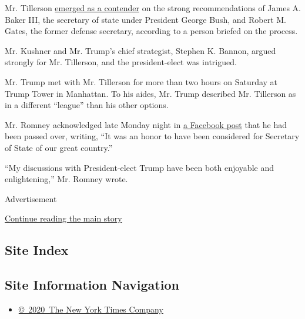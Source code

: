 Mr. Tillerson
\href{https://www.nytimes3xbfgragh.onion/2016/12/09/us/politics/rex-tillerson-secretary-of-state-exxon-donald-trump.html}{emerged
as a contender} on the strong recommendations of James A. Baker III, the
secretary of state under President George Bush, and Robert M. Gates, the
former defense secretary, according to a person briefed on the process.

Mr. Kushner and Mr. Trump's chief strategist, Stephen K. Bannon, argued
strongly for Mr. Tillerson, and the president-elect was intrigued.

Mr. Trump met with Mr. Tillerson for more than two hours on Saturday at
Trump Tower in Manhattan. To his aides, Mr. Trump described Mr.
Tillerson as in a different ``league'' than his other options.

Mr. Romney acknowledged late Monday night in
\href{https://www.facebookcorewwwi.onion/mittromney/posts/10153988122401121}{a
Facebook post} that he had been passed over, writing, ``It was an honor
to have been considered for Secretary of State of our great country.''

``My discussions with President-elect Trump have been both enjoyable and
enlightening,'' Mr. Romney wrote.

Advertisement

\protect\hyperlink{after-bottom}{Continue reading the main story}

\hypertarget{site-index}{%
\subsection{Site Index}\label{site-index}}

\hypertarget{site-information-navigation}{%
\subsection{Site Information
Navigation}\label{site-information-navigation}}

\begin{itemize}
\tightlist
\item
  \href{https://help.nytimes3xbfgragh.onion/hc/en-us/articles/115014792127-Copyright-notice}{©~2020~The
  New York Times Company}
\end{itemize}

